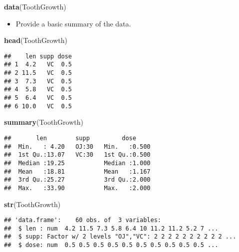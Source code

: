 \documentclass[]{article}
\newenvironment{Shaded}{\begin{snugshade}}{\end{snugshade}}
\newcommand{\KeywordTok}[1]{\textcolor[rgb]{0.13,0.29,0.53}{\textbf{#1}}}
\newcommand{\NormalTok}[1]{#1}
\providecommand{\tightlist}{%
  \setlength{\itemsep}{0pt}\setlength{\parskip}{0pt}}
\begin{document}
\begin{Shaded}
\begin{Highlighting}[]
\KeywordTok{data}\NormalTok{(ToothGrowth)}
\end{Highlighting}
\end{Shaded}

\begin{itemize}
\tightlist
\item
  Provide a basic summary of the data.
\end{itemize}

\begin{Shaded}
\begin{Highlighting}[]
\KeywordTok{head}\NormalTok{(ToothGrowth)}
\end{Highlighting}
\end{Shaded}

\begin{verbatim}
##    len supp dose
## 1  4.2   VC  0.5
## 2 11.5   VC  0.5
## 3  7.3   VC  0.5
## 4  5.8   VC  0.5
## 5  6.4   VC  0.5
## 6 10.0   VC  0.5
\end{verbatim}

\begin{Shaded}
\begin{Highlighting}[]
\KeywordTok{summary}\NormalTok{(ToothGrowth)}
\end{Highlighting}
\end{Shaded}

\begin{verbatim}
##       len        supp         dose      
##  Min.   : 4.20   OJ:30   Min.   :0.500  
##  1st Qu.:13.07   VC:30   1st Qu.:0.500  
##  Median :19.25           Median :1.000  
##  Mean   :18.81           Mean   :1.167  
##  3rd Qu.:25.27           3rd Qu.:2.000  
##  Max.   :33.90           Max.   :2.000
\end{verbatim}

\begin{Shaded}
\begin{Highlighting}[]
\KeywordTok{str}\NormalTok{(ToothGrowth)}
\end{Highlighting}
\end{Shaded}

\begin{verbatim}
## 'data.frame':    60 obs. of  3 variables:
##  $ len : num  4.2 11.5 7.3 5.8 6.4 10 11.2 11.2 5.2 7 ...
##  $ supp: Factor w/ 2 levels "OJ","VC": 2 2 2 2 2 2 2 2 2 2 ...
##  $ dose: num  0.5 0.5 0.5 0.5 0.5 0.5 0.5 0.5 0.5 0.5 ...
\end{verbatim}
\end{document}
